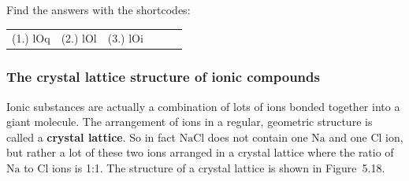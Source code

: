         

      
      \label{m38684*uid69}
\par {} Find the answers with the shortcodes:
 \par \begin{tabular}[h]{cccccc}
 (1.) lOq  &  (2.) lOl  &  (3.) lOi  & \end{tabular}



            \subsubsection{ The crystal lattice structure of ionic compounds}
            \nopagebreak
            
        
        \label{m38684*id142771}Ionic substances are actually a combination of lots of ions bonded
together into a giant molecule. The arrangement of ions in a regular,
geometric structure is called a \textbf{crystal lattice}. So in
fact \begin{math}\mathrm{NaCl}\end{math} does not contain one \begin{math}\mathrm{Na}\end{math} and one \begin{math}\mathrm{Cl}\end{math} ion, but rather a lot of
these two ions arranged in a crystal lattice where the ratio of \begin{math}\mathrm{Na}\end{math} to
\begin{math}\mathrm{Cl}\end{math} ions is 1:1. The structure of a crystal lattice is shown in Figure~5.18.\par 
        
    \setcounter{subfigure}{0}


